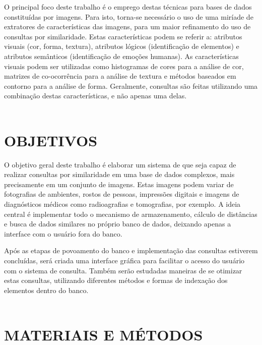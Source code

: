 O principal foco deste trabalho é o emprego destas técnicas para bases de dados constituídas por imagens. Para isto, torna-se necessário o uso de uma miríade de extratores de características
das imagens, para um maior refinamento do uso de consultas por similaridade. Estas características podem se referir a: atributos visuais (cor, forma, textura), atributos lógicos (identificação
de elementos) e atributos semânticos (identificação de emoções humanas). As características visuais podem ser utilizadas como histogramas de cores para a análise de cor, matrizes de co-ocorrência para a análise de textura e
métodos baseados em contorno para a análise de forma. Geralmente, consultas são feitas utilizando uma combinação destas características, e não apenas uma delas.
\\ \\

{\let\clearpage\relax \chapter{OBJETIVOS}}
\label{chap:objetivos}

O objetivo geral deste trabalho é elaborar um sistema de que seja capaz de realizar consultas por similaridade em uma base de dados complexos, mais precisamente em um conjunto de imagens.
Estas imagens podem variar de fotografias de ambientes, rostos de pessoas, impressões digitais e imagens de diagnósticos médicos como radioagrafias e tomografias, por exemplo.
A ideia central é implementar todo o mecanismo de armazenamento, cálculo de distâncias e busca de dados similares no próprio banco de dados, deixando apenas a interface com o usuário fora do banco.

Após as etapas de povoamento do banco e implementação das consultas estiverem concluídas, será criada uma interface gráfica para facilitar o acesso do usuário com o sistema de consulta. Também serão
estudadas maneiras de se otimizar estas consultas, utilizando diferentes métodos e formas de indexação dos elementos dentro do banco. \\ \\



{\let\clearpage\relax \chapter{MATERIAIS E MÉTODOS}}
\label{chap:matmetodos}

